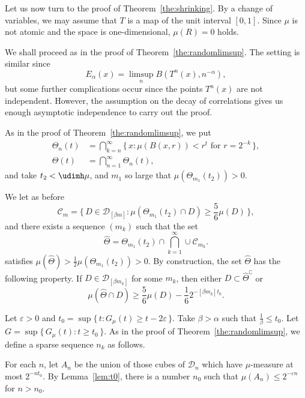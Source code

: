 Let us now turn to the proof of Theorem~\ref{the:shrinking}. By a change of variables, we may assume that $T$ is a map of the unit interval $[0,1]$. Since $\mu$ is not atomic and the space is one-dimensional, $\mu (R) = 0$ holds.

We shall proceed as in the proof of Theorem~\ref{the:randomlimsup}. The setting is similar since
\[
E_\alpha (x) = \limsup_n B(T^n (x), n^{-\alpha}),
\]
but some further complications occur since the points $T^n (x)$ are not independent. However, the assumption on the decay of correlations gives us enough asymptotic independence to carry out the proof.

As in the proof of Theorem~\ref{the:randomlimsup}, we put
\begin{align*}
\Theta_n (t) &= \bigcap_{k=n}^\infty \{\, x : \mu (B(x,r)) < r^t
\text{ for } r = 2^{- k} \,\}, \\ \Theta (t) &= \bigcap_{n=1}^\infty
\Theta_n (t),
\end{align*}
and take $t_2 < \udimh \mu$, and $m_1$ so large that $\mu (\Theta_{m_1} (t_2)) > 0$.

We let as before
\[
\mathscr{C}_m = \{\, D \in \mathscr{D}_{[\beta m]} : \mu (\Theta_{m_1} (t_2) \cap D) \geq \frac{5}{6} \mu (D) \,\},
\]
and there exists a sequence $(m_k)$ such that the set
\[
\hat{\Theta} = \Theta_{m_1} (t_2) \cap \bigcap_{k=1}^\infty \cup
\mathscr{C}_{m_k}.
\]
satisfies $\mu (\hat{\Theta}) > \frac{1}{2} \mu (\Theta_{m_1} (t_2)) > 0$. By construction, the set $\hat{\Theta}$ has the following property. If $D \in \mathscr{D}_{[\beta m_k]}$ for some $m_k$, then either $D \subset \hat{\Theta}^\complement$ or
\begin{equation}\label{eq:propertyofDelta2}
\mu (\hat{\Theta} \cap D) \geq \frac{5}{6} \mu (D) - \frac{1}{6} 2^{-[\beta m_k]t_0}.
\end{equation}

Let $\varepsilon > 0$ and $t_0 = \sup \{\, t: G_\mu (t) \geq t - 2
\varepsilon \,\}$. Take $\beta > \alpha$ such that $\frac{1}{\beta}
\leq t_0$. Let $G = \sup \{\, G_\mu (t) : t \geq t_0 \,\}$. As in the proof of Theorem~\ref{the:randomlimsup}, we define a sparse sequence $n_k$ as follows.

For each $n$, let $A_n$ be the union of those cubes of $\mathscr{D}_n$ which have $\mu$-measure at most $2^{-n t_0}$. By Lemma~\ref{lem:t0}, there is a number $n_0$ such that $\mu (A_n) \leq 2^{-\varepsilon n}$ for $n > n_0$.

